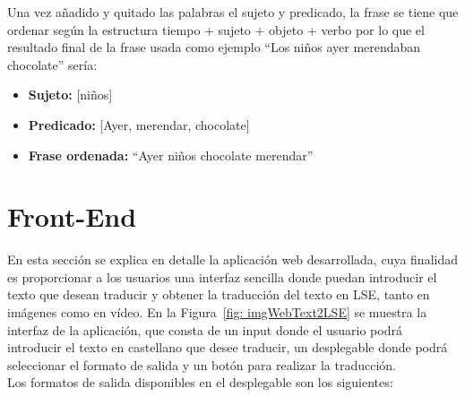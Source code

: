 Una vez añadido y quitado las palabras el sujeto y predicado, la frase se tiene que ordenar según la estructura tiempo + sujeto + objeto + verbo por lo que el resultado final de la frase usada como ejemplo ``Los niños ayer merendaban chocolate'' sería: 

\begin{center}
	\begin{itemize}
		\item \textbf{Sujeto:}  [niños]
		\item \textbf{Predicado:} [Ayer, merendar, chocolate]
		\item \textbf{Frase ordenada:} ``Ayer niños chocolate merendar'' 
		
		
	\end{itemize}
\end{center}



\section{Front-End}

En esta sección se explica en detalle la aplicación web desarrollada, cuya finalidad es proporcionar a los usuarios una interfaz sencilla donde puedan introducir el texto que desean traducir y obtener la traducción del texto en LSE, tanto en imágenes como en vídeo. En la  Figura~\ref {fig: imgWebText2LSE} se muestra la interfaz de la aplicación, que consta de un input donde el usuario podrá introducir el texto en castellano que desee traducir, un desplegable donde podrá seleccionar el formato de salida y un botón para realizar la traducción.\\

Los formatos de salida disponibles en el desplegable son los siguientes:

